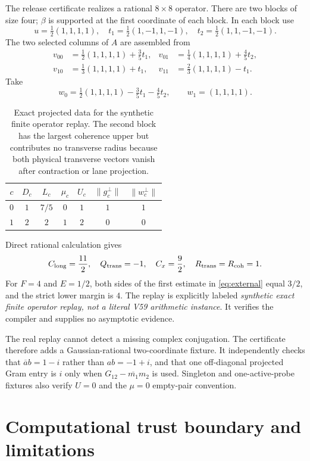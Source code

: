 \documentclass[10pt]{article}
\newcommand{\norm}[1]{\lVert #1\rVert}
\newcommand{\conj}[1]{\overline{#1}}
\begin{document}
The release certificate realizes a rational $8\times8$ operator.  There are
two blocks of size four; $\beta$ is supported at the first coordinate of each
block.  In each block use
\[
 u=\tfrac12(1,1,1,1),\quad
 t_1=\tfrac12(1,-1,1,-1),\quad
 t_2=\tfrac12(1,1,-1,-1).
\]
The two selected columns of $A$ are assembled from
\begin{align*}
 v_{00}&=\tfrac12(1,1,1,1)+\tfrac35t_1,&
 v_{01}&=\tfrac14(1,1,1,1)+\tfrac45t_2,\\
 v_{10}&=\tfrac13(1,1,1,1)+t_1,&
 v_{11}&=\tfrac23(1,1,1,1)-t_1.
\end{align*}
Take
\[
 w_0=\tfrac12(1,1,1,1)-\tfrac35t_1-\tfrac45t_2,\qquad
 w_1=(1,1,1,1).
\]

\begin{table}[h]
\centering
\small
\begin{tabular}{c@{\qquad}cccccc}
\toprule
$c$ & $D_c$ & $L_c$ & $\mu_c$ & $U_c$ & $\norm{g_c^\perp}$ & $\norm{w_c^\perp}$\\
\midrule
$0$ & $1$ & $7/5$ & $0$ & $1$ & $1$ & $1$\\
$1$ & $2$ & $2$ & $1$ & $2$ & $0$ & $0$\\
\bottomrule
\end{tabular}
\caption{Exact projected data for the synthetic finite operator replay.  The
second block has the largest coherence upper but contributes no transverse
radius because both physical transverse vectors vanish after contraction or
lane projection.}
\label{tab:fixture}
\end{table}

Direct rational calculation gives
\[
 C_{\rm long}=\frac{11}{2},\quad Q_{\rm trans}=-1,\quad
 C_x=\frac92,\quad R_{\rm trans}=R_{\rm coh}=1.
\]
For $F=4$ and $E=1/2$, both sides of the first estimate in
\eqref{eq:external} equal $3/2$, and the strict lower margin is $4$.
The replay is explicitly labeled
\emph{synthetic exact finite operator replay, not a literal V59 arithmetic
instance}.  It verifies the compiler and supplies no asymptotic evidence.

The real replay cannot detect a missing complex conjugation.  The certificate
therefore adds a Gaussian-rational two-coordinate fixture.  It independently
checks that $\conj a b=1-i$ rather than $ab=-1+i$, and that one off-diagonal
projected Gram entry is $i$ only when
$G_{12}-\conj{m_1}m_2$ is used.  Singleton and one-active-probe fixtures also
verify $U=0$ and the $\mu=0$ empty-pair convention.

\section{Computational trust boundary and limitations}
\end{document}
